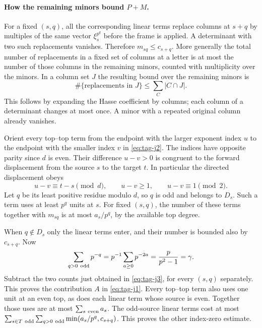 \paragraph{How the remaining minors bound \(P+M\).}
For a fixed \((s,q)\), all the corresponding linear terms replace
columns at \(s+q\) by multiples of the same vector
\(\xi_s^{p^q}\) before the frame is applied. A determinant with two
such replacements vanishes. Therefore \(m_{sq}\le c_{s+q}\).
More generally the total number of replacements in a fixed set of
columns at a letter is at most the number of those columns in
the remaining minors, counted with multiplicity over the minors.
In a column set \(J\) the resulting bound over the remaining minors is
\[
  \#\{\text{replacements in }J\}\le\sum_{C}|C\cap J|.
\]
This follows by expanding the Hasse coefficient by columns;
each column of a determinant changes at most once. A minor with
a repeated original column already vanishes.

Orient every top--top term from the endpoint with the larger
exponent index \(u\) to the endpoint with the smaller index \(v\)
in \eqref{eq:tag-j2}. The indices have opposite parity since \(d\) is even.
Their difference \(u-v>0\) is congruent to the forward displacement
from the source \(s\) to the target \(t\).
In particular the directed displacement obeys
\[
  u-v\equiv t-s\pmod d,\qquad u-v\ge1,\qquad u-v\equiv1\pmod2 .
\]
 Let \(q\) be its least
positive residue modulo \(d\), so \(q\) is odd and belongs to
\(D_s\). Such a term uses at least \(p^q\) units at \(s\).
For fixed \((s,q)\), the number of these terms together with
\(m_{sq}\) is at most \(a_s/p^q\), by the available top degree.

When \(q\notin D_s\) only the linear terms enter, and their
number is bounded also by \(c_{s+q}\). Now
\[
 \sum_{q>0\ {\rm odd}}p^{-q}=p^{-1}\sum_{a\ge0}p^{-2a}=\frac{p}{p^2-1}=\gamma.
\]
Subtract the two counts just obtained in \eqref{eq:tag-j3}, for every
\((s,q)\) separately. This proves the contribution \(A\) in \eqref{eq:tag-j1}.
Every top--top term also uses one unit at an even top, as does
each linear term whose source is even. Together those uses are
at most \(\sum_{s\ {\rm even}}a_s\). The odd-source linear
terms cost at most
\(\sum_{s\in T\ {\rm odd}}\sum_{q>0\ {\rm odd}}\min(a_s/p^q,c_{s+q})\).
This proves the other index-zero estimate.

